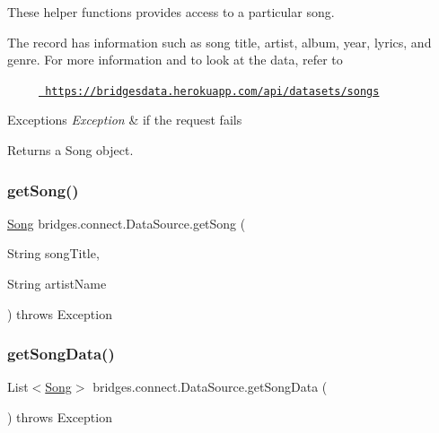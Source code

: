 These helper functions provides access to a particular song.

The record has information such as song title, artist, album, year, lyrics, and genre. For more information and to look at the data, refer to 

~~~~~\href{https://bridgesdata.herokuapp.com/api/datasets/songs}{\texttt{ https\+://bridgesdata.\+herokuapp.\+com/api/datasets/songs}} 


\begin{DoxyExceptions}{Exceptions}
{\em Exception} & if the request fails\\
\hline
\end{DoxyExceptions}
\begin{DoxyReturn}{Returns}
a Song object. 
\end{DoxyReturn}
\mbox{\label{classbridges_1_1connect_1_1_data_source_a935ea2005b7de3cb22c1e55027b81460}} 
\subsubsection{\texorpdfstring{getSong()}{getSong()}\hspace{0.1cm}{\footnotesize\ttfamily [2/2]}}
{\footnotesize\ttfamily \mbox{\hyperlink{classbridges_1_1data__src__dependent_1_1_song}{Song}} bridges.\+connect.\+Data\+Source.\+get\+Song (\begin{DoxyParamCaption}\item[{String}]{song\+Title,  }\item[{String}]{artist\+Name }\end{DoxyParamCaption}) throws Exception}

\mbox{\label{classbridges_1_1connect_1_1_data_source_ad4e2f30df95e8ce5976d0447c480522e}} 
\subsubsection{\texorpdfstring{getSongData()}{getSongData()}}
{\footnotesize\ttfamily List$<$\mbox{\hyperlink{classbridges_1_1data__src__dependent_1_1_song}{Song}}$>$ bridges.\+connect.\+Data\+Source.\+get\+Song\+Data (\begin{DoxyParamCaption}{ }\end{DoxyParamCaption}) throws Exception}

